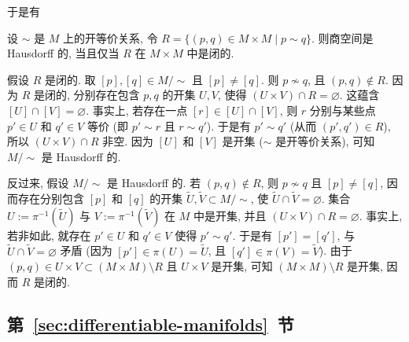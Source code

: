 \begin{enumerate}[label=(\arabic*),leftmargin=*]
于是有

\begin{RiemannProposition}\label{prop:topology-of-quotients}
设 $\sim$ 是 $M$ 上的开等价关系, 令 $R=\{(p,q)\in M\times M\mid p\sim q\}$. 则商空间是 Hausdorff 的, 当且仅当 $R$ 在 $M\times M$ 中是闭的.
\end{RiemannProposition}

\begin{RiemannProof}
假设 $R$ 是闭的. 取 $[p],[q]\in M/{\sim}$ 且 $[p]\ne[q]$. 则 $p\not\sim q$, 且 $(p,q)\notin R$. 因为 $R$ 是闭的, 分别存在包含 $p,q$ 的开集 $U,V$, 使得 $(U\times V)\cap R=\varnothing$. 这蕴含 $[U]\cap[V]=\varnothing$. 事实上, 若存在一点 $[r]\in[U]\cap[V]$, 则 $r$ 分别与某些点 $p'\in U$ 和 $q'\in V$ 等价 (即 $p'\sim r$ 且 $r\sim q'$). 于是有 $p'\sim q'$ (从而 $(p',q')\in R$), 所以 $(U\times V)\cap R$ 非空. 因为 $[U]$ 和 $[V]$ 是开集 ($\sim$ 是开等价关系), 可知 $M/{\sim}$ 是 Hausdorff 的.

反过来, 假设 $M/{\sim}$ 是 Hausdorff 的. 若 $(p,q)\notin R$, 则 $p\not\sim q$ 且 $[p]\ne[q]$, 因而存在分别包含 $[p]$ 和 $[q]$ 的开集 $\widetilde U,\widetilde V\subset M/{\sim}$, 使 $\widetilde U\cap\widetilde V=\varnothing$. 集合 $U:=\pi^{-1}(\widetilde U)$ 与 $V:=\pi^{-1}(\widetilde V)$ 在 $M$ 中是开集, 并且 $(U\times V)\cap R=\varnothing$. 事实上, 若非如此, 就存在 $p'\in U$ 和 $q'\in V$ 使得 $p'\sim q'$. 于是有 $[p']=[q']$, 与 $\widetilde U\cap\widetilde V=\varnothing$ 矛盾 (因为 $[p']\in\pi(U)=\widetilde U$, 且 $[q']\in\pi(V)=\widetilde V$). 由于 $(p,q)\in U\times V\subset(M\times M)\setminus R$ 且 $U\times V$ 是开集, 可知 $(M\times M)\setminus R$ 是开集, 因而 $R$ 是闭的.
\end{RiemannProof}
\end{enumerate}

\subsection[第 \ref{sec:differentiable-manifolds} 节]{第~\ref{sec:differentiable-manifolds}~节}\label{subsec:notes-differentiability}


